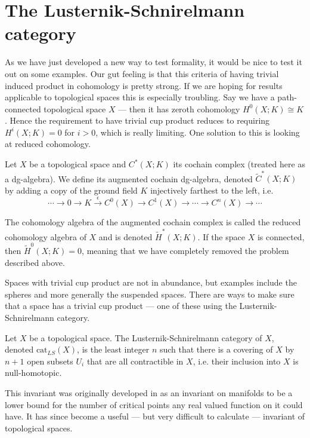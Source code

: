 
\section{The Lusternik-Schnirelmann category}

As we have just developed a new way to test formality, it would be nice to test it out on 
some examples. Our gut feeling is that this criteria of having trivial induced product in 
cohomology is pretty strong. If we are hoping for results applicable to topological spaces 
this is especially troubling. Say we have a path-connected topological space $X$ — then it 
has zeroth cohomology $H^0(X;K)\cong K$. Hence the requirement to have trivial cup product 
reduces to requiring $H^i(X;K)=0$ for $i>0$, which is really limiting. One solution to this 
is looking at reduced cohomology.

\begin{definition}
    Let $X$ be a topological space and $C^*(X;K)$ its cochain complex (treated here as a 
    dg-algebra). We define its augmented cochain dg-algebra, denoted 
    $\widetilde{C}^*(X;K)$ by adding a copy of the ground field $K$ injectively farthest 
    to the left, i.e.
    $$\cdots \longrightarrow 0 \longrightarrow K \overset{\epsilon}\longrightarrow C^0(X)\longrightarrow C^1(X) \longrightarrow \cdots \longrightarrow C^n(X) \longrightarrow \cdots $$
\end{definition} 

The cohomology algebra of the augmented cochain complex is called the reduced cohomology 
algebra of $X$ and is denoted $\widetilde{H}^*(X;K)$. If the space $X$ is connected, 
then $\widetilde{H}^0(X;K)=0$, meaning that we have completely removed the problem 
described above.

Spaces with trivial cup product are not in abundance, but examples include the spheres 
and more generally the suspended spaces. There are ways to make sure that a space has a 
trivial cup product — one of these using the Lusternik-Schnirelmann category. 

\begin{definition}
    Let $X$ be a topological space. The Lusternik-Schnirelmann category of $X$, denoted 
    $\text{cat}_{LS}(X)$, is the least integer $n$ such that there is a covering of $X$ 
    by $n+1$ open subsets $U_i$ that are all contractible in $X$, i.e. their inclusion 
    into $X$ is null-homotopic.    
\end{definition}

This invariant was originally developed in \cite{lscat} as an invariant on manifolds to be 
a lower bound for the number of critical points any real valued function on it could have. 
It has since become a useful — but very difficult to calculate — invariant of topological 
spaces. 

